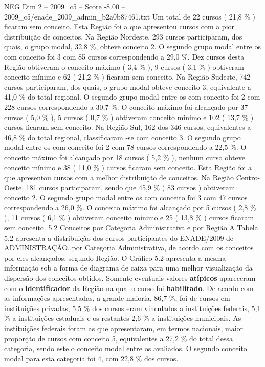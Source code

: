 \begin{textsample}{NEG Dim 2 – 2009\_c5 – Score -8.00 – 2009\_c5/enade\_2009\_admin\_b2a0b87461.txt}
Um total de 22 cursos ( 21,8 \% ) ficaram sem conceito.
Esta Região foi a que apresentou cursos com a pior distribuição de conceitos.
Na Região Nordeste, 293 cursos participaram, dos quais, o grupo modal, 32,8 \%, obteve conceito 2.
O segundo grupo modal entre os com conceito foi 3 com 85 cursos correspondendo a 29,0 \%.
Dez cursos desta Região obtiveram o conceito máximo ( 3,4 \% ), 9 cursos ( 3,1 \% ) obtiveram conceito mínimo e 62 ( 21,2 \% ) ficaram sem conceito.
Na Região Sudeste, 742 cursos participaram, dos quais, o grupo modal obteve conceito 3, equivalente a 41,0 \% do total regional.
O segundo grupo modal entre os com conceito foi 2 com 228 cursos correspondendo a 30,7 \%.
O conceito máximo foi alcançado por 37 cursos ( 5,0 \% ), 5 cursos ( 0,7 \% ) obtiveram conceito mínimo e 102 ( 13,7 \% ) cursos ficaram sem conceito.
Na Região Sul, 162 dos 346 cursos, equivalentes a 46,8 \% do total regional, classificaram -se com conceito 3.
O segundo grupo modal entre os com conceito foi 2 com 78 cursos correspondendo a 22,5 \%.
O conceito máximo foi alcançado por 18 cursos ( 5,2 \% ), nenhum curso obteve conceito mínimo e 38 ( 11,0 \% ) cursos ficaram sem conceito.
Esta Região foi a que apresentou cursos com a melhor distribuição de conceitos.
Na Região Centro-Oeste, 181 cursos participaram, sendo que 45,9 \% ( 83 cursos ) obtiveram conceito 2.
O segundo grupo modal entre os com conceito foi 3 com 47 cursos correspondendo a 26,0 \%.
O conceito máximo foi alcançado por 5 cursos ( 2,8 \% ), 11 cursos ( 6,1 \% ) obtiveram conceito mínimo e 25 ( 13,8 \% ) cursos ficaram sem conceito. 5.2 Conceitos por Categoria Administrativa e por Região A Tabela 5.2 apresenta a distribuição dos cursos participantes do ENADE/2009 de ADMINISTRAÇÃO, por Categoria Administrativa, de acordo com os conceitos por eles alcançados, segundo Região.
O Gráfico 5.2 apresenta a mesma informação sob a forma de diagrama de caixa para uma melhor visualização da dispersão dos conceitos obtidos.
Somente eventuais valores \textbf{atípicos} apareceram com o \textbf{identificador} da Região na qual o curso foi \textbf{habilitado}.
De acordo com as informações apresentadas, a grande maioria, 86,7 \%, foi de cursos em instituições privadas, 5,5 \% dos cursos eram vinculados a instituições federais, 5,1 \% a instituições estaduais e os restantes 2,6 \% a instituições municipais.
As instituições federais foram as que apresentaram, em termos nacionais, maior proporção de cursos com conceito 5, equivalentes a 27,2 \% do total dessa categoria, sendo este o conceito modal entre os avaliados.
O segundo conceito modal para esta categoria foi 4, com 22,8 \% dos cursos.

\end{textsample}
